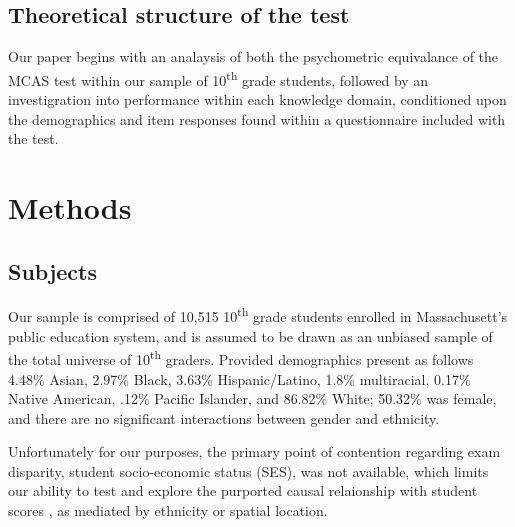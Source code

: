 \documentclass{article}\usepackage[]{graphicx}\usepackage[]{color}
\begin{document}
\subsection{Theoretical structure of the test}
Our paper begins with an analaysis of both the psychometric equivalance of the MCAS test within our sample of 10\textsuperscript{th} grade students, followed by an investigration into performance within each knowledge domain, conditioned upon the demographics and item responses found within a questionnaire included with the test.
\section{Methods}
\subsection{Subjects}
Our sample is comprised of 10,515 10\textsuperscript{th} grade students enrolled in Massachusett's public education system, and is assumed to be drawn as an unbiased sample of the total universe of 10\textsuperscript{th} graders. Provided demographics present as follows 4.48\% Asian, 2.97\% Black, 3.63\% Hispanic/Latino, 1.8\% multiracial, 0.17\% Native American, .12\% Pacific Islander, and 86.82\% White; 50.32\% was female, and there are no significant interactions between gender and ethnicity.

Unfortunately for our purposes, the primary point of contention regarding exam disparity, student socio-economic status (SES), was not available, which limits our ability to test and explore the purported causal relaionship with student scores \cite{Gaudet}, as mediated by ethnicity or spatial location. 
\end{document}

